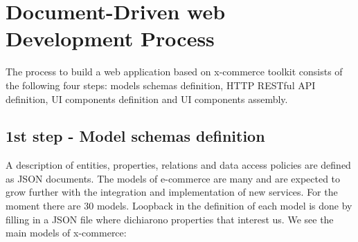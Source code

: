 \section{Document-Driven web Development Process}
\label{sec:document_driven_web_development_process}
The process to build a web application based on x-commerce toolkit consists of the following four steps: models schemas definition, HTTP RESTful API definition, UI components definition and UI components assembly.
\subsection{1st step - Model schemas definition}
A description of entities, properties, relations and data access policies are defined as JSON documents.
\newline
The models of e-commerce are many and are expected to grow further with the integration and implementation of new services. For the moment there are 30 models. Loopback in the definition of each model is done by filling in a JSON file where dichiarono properties that interest us. We see the main models of x-commerce:
